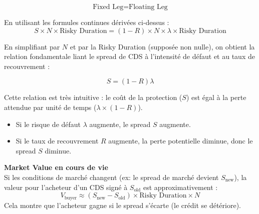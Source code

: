 \begin{equation}
    \text{Fixed Leg} = \text{Floating Leg}
\end{equation}

En utilisant les formules continues dérivées ci-dessus :
\begin{equation}
    S \times N \times \text{Risky Duration} = (1-R) \times N \times \lambda \times \text{Risky Duration}
\end{equation}

En simplifiant par $N$ et par la Risky Duration (supposée non nulle), on obtient la relation fondamentale liant le spread de CDS à l'intensité de défaut et au taux de recouvrement :

\begin{tcolorbox}[colback=blue!5,colframe=blue!40,title=Formule du Spread de CDS (Fair Value)]
\begin{equation}
    S = (1-R) \lambda
\end{equation}
\end{tcolorbox}

Cette relation est très intuitive : le coût de la protection ($S$) est égal à la perte attendue par unité de temps ($\lambda \times (1-R)$).
\begin{itemize}
    \item Si le risque de défaut $\lambda$ augmente, le spread $S$ augmente.
    \item Si le taux de recouvrement $R$ augmente, la perte potentielle diminue, donc le spread $S$ diminue.
\end{itemize}

\textbf{Market Value en cours de vie} \\
Si les conditions de marché changent (ex: le spread de marché devient $S_{\text{new}}$), la valeur pour l'acheteur d'un CDS signé à $S_{\text{old}}$ est approximativement :
\begin{equation}
    V_{\text{buyer}} \approx (S_{\text{new}} - S_{\text{old}}) \times \text{Risky Duration} \times N
\end{equation}
Cela montre que l'acheteur gagne si le spread s'écarte (le crédit se détériore).
